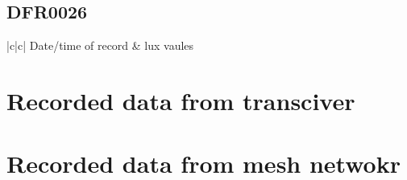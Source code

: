 \subsection{DFR0026}
\begin{table}
    \begin{tabular*}{|c|c|}
        Date/time of record & lux vaules
    \end{tabular*}
    \caption*{Recorded data from DFR0026 on the \today}
    \label*{Recorded data from DFR0026 on the \today}
\end{table}
\section{Recorded data from transciver}
\section{Recorded data from mesh netwokr}